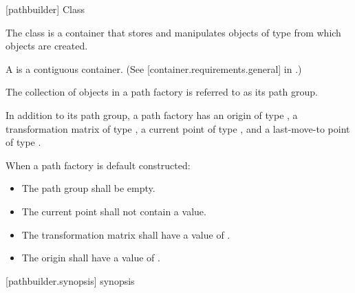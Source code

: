  [pathbuilder] {Class }

\pnum
{}
The class  is a container that stores and manipulates objects of type  from which  objects are created.

\pnum
A  is a contiguous container. (See [container.requirements.general] in \cppseventeen.)

\pnum
The collection of  objects in a path factory is referred to as its path group.

\pnum
In addition to its path group, a path factory has an origin of type , a transformation matrix of type , a current point of type , and a last-move-to point of type .

\pnum
When a path factory is default constructed:

\begin{itemize}
	\item The path group shall be empty.
	\item The current point shall not contain a value.
	\item The transformation matrix shall have a value of .
	\item The origin shall have a value of .
\end{itemize}

 [pathbuilder.synopsis] { synopsis}

